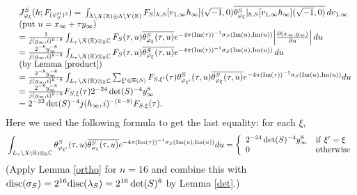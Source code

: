 \documentclass[11pt]{amsart}
\numberwithin{equation}{section}
\theoremstyle{definition}
\begin{document}
$$
\begin{array}{rl}
& J^S_{\varphi_\xi}(h;F_{(\psi^{{\rm st}}_S)^2})=
{\displaystyle}\int_{\Lambda{\backslash} X({\mathbb{R}})\oplus \Lambda{\backslash} Y({\mathbb{R}})}
F_S|_{k,S}[v_{1,\infty}h_\infty](\sqrt{-1},0)
\overline{\theta^S_{\varphi_\xi}|_{8,S}[v_{1,\infty}h_\infty](\sqrt{-1},0)}\, dv_{1,\infty}\\
&(\mbox{put $u=x_\infty+\tau y_\infty$})\\
& ={\displaystyle}\frac{1}{j(g_\infty,i)^{k-8}}
{\displaystyle}\int_{L_\tau{\backslash} X({\mathbb{R}})\otimes_{\mathbb{R}} {\mathbb{C}}}
F_S(\tau,u)\overline{\theta^S_{\varphi_\xi}(\tau,u)}e^{-4\pi({\rm Im}(\tau))^{-1}\sigma_S({\rm Im}(u), {\rm Im}(u))}
\Big|{\displaystyle}\frac{\partial(x_\infty,y_\infty)}{\partial u}\Big| \, du\\
&={\displaystyle}\frac{2^{-8}y^{-8}_\infty}{j(g_\infty,i)^{k-8}}
{\displaystyle}\int_{L_\tau{\backslash} X({\mathbb{R}})\otimes_{\mathbb{R}} {\mathbb{C}}}
F_S(\tau,u)\overline{\theta^S_{\varphi_\xi}(\tau,u)}e^{-4\pi({\rm Im}(\tau))^{-1}\sigma_S({\rm Im}(u), {\rm Im}(u))} \, du\\
&\mbox{(by Lemma \ref{product})} \\ 
&={\displaystyle}\frac{2^{-8}y^{-8}_\infty}{j(g_\infty,i)^{k-8}}
{\displaystyle}\int_{L_\tau{\backslash} X({\mathbb{R}})\otimes_{\mathbb{R}} {\mathbb{C}}}
\sum_{\xi'\in \Xi(S)}F_{S,\xi'}(\tau) \theta^S_{\varphi_{\xi'}}(\tau,u)\overline{\theta^S_{\varphi_\xi}(\tau,u)}e^{-4\pi({\rm Im}(\tau))^{-1}\sigma_S({\rm Im}(u), {\rm Im}(u))}du \\
&={\displaystyle}\frac{2^{-8}y^{-8}_\infty}{j(g_\infty,i)^{k-8}}F_{S,\xi}(\tau)2^{-24}\det(S)^{-4}y^{8}_\infty \\
&= 2^{-32}\det(S)^{-4}j(h_\infty,i)^{-(k-8)}F_{S,\xi}(\tau). 
\end{array}
$$
Here we used the following formula to get the last equality: for each $\xi$, 
$${\displaystyle}\int_{L_\tau\backslash X({\mathbb{R}})\otimes_{\mathbb{R}} {\mathbb{C}}}
 \theta^S_{\varphi_{\xi'}}(\tau,u)\overline{\theta^S_{\varphi_\xi}(\tau,u)}e^{-4\pi({\rm Im}(\tau))^{-1}
\sigma_S({\rm Im}(u), {\rm Im}(u))}du
=\left\{
\begin{array}{ll}
2^{-24}\det(S)^{-4}y^{8}_\infty & {\rm if}\ \xi'=\xi \\
0& {\rm otherwise}
\end{array}\right.
$$ 
(Apply Lemma \ref{ortho} for $n=16$ and combine this with ${\rm disc}(\sigma_S)=2^{16}{\rm disc}(\lambda_S)=
2^{16}\det(S)^8$ by Lemma \ref{det}.) 
\end{document}
